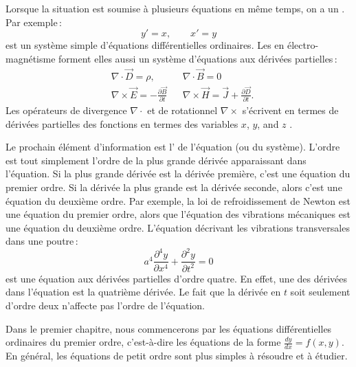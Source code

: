 Lorsque la situation est soumise \`a plusieurs \'equations en m\^eme temps, on a un
\emph{}.  Par exemple\,: 
\begin{equation*}
y' = x , \qquad x' = y
\end{equation*}
est un syst\`eme simple d'\'equations diff\'erentielles ordinaires.
Les  en \'electro-magn\'etisme forment elles aussi un syst\`eme d'\'equations aux d\'eriv\'ees partielles\,:
\begin{align*}
& \nabla \cdot \vec{D} = \rho, & & \nabla \cdot \vec{B} = 0  \\
& \nabla \times \vec{E} = - \frac{\partial \vec{B}}{\partial t} &
& \nabla \times \vec{H} = \vec{J} + \frac{\partial \vec{D}}{\partial t} .
\end{align*}
 Les op\'erateurs de divergence $\nabla \cdot$ et de rotationnel $\nabla \times$ s'\'ecrivent en termes de d\'eriv\'ees partielles des fonctions en termes des variables $x$, $y$, and $z$ .

\medskip

Le prochain \'el\'ement d'information est l'\emph{} de l'\'equation (ou du syst\`eme).   L'ordre est tout simplement l'ordre de la plus grande d\'eriv\'ee apparaissant dans l'\'equation.  Si la plus grande d\'eriv\'ee est la d\'eriv\'ee premi\`ere, c'est une \'equation du premier ordre.  Si la d\'eriv\'ee la plus grande est la d\'eriv\'ee seconde, alors c'est une \'equation du deuxi\`eme ordre.  Par exemple, la loi de refroidissement de Newton est une \'equation du premier ordre, alors que l'\'equation des vibrations m\'ecaniques est une \'equation du deuxi\`eme ordre.  L'\'equation d\'ecrivant les vibrations transversales dans une poutre\,: 
\begin{equation*}
a^4 \frac{\partial^4 y}{\partial x^4} + \frac{\partial^2 y}{\partial t^2} = 0
\end{equation*}
est une \'equation aux d\'eriv\'ees partielles d'ordre quatre.  En effet, une des d\'eriv\'ees dans l'\'equation est la quatri\`eme d\'eriv\'ee.  Le fait que la d\'eriv\'ee en $t$ soit seulement d'ordre deux n'affecte pas l'ordre de l'\'equation.

Dans le premier chapitre, nous commencerons par les \'equations diff\'erentielles ordinaires du premier ordre, c'est-\`a-dire les \'equations de la forme 
 $\frac{dy}{dx} = f(x,y)$.  En g\'en\'eral, les \'equations de petit ordre sont plus simples \`a r\'esoudre et \`a \'etudier.

